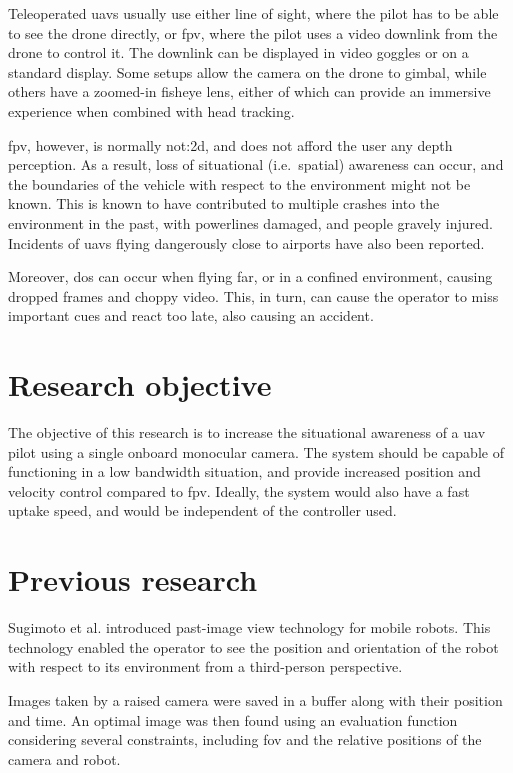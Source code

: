 Teleoperated \glspl{uav} usually use either line of sight, where the pilot has to be able to see the drone directly, or \gls{fpv}, where the pilot uses a video downlink from the drone to control it.
The downlink can be displayed in video goggles or on a standard display.
Some setups allow the camera on the drone to gimbal, while others have a zoomed-in fisheye lens, either of which can provide an immersive experience when combined with head tracking.

\gls{fpv}, however, is normally \gls{not:2d}, and does not afford the user any depth perception.
As a result, loss of situational (i.e.\ spatial) awareness can occur, and the boundaries of the vehicle with respect to the environment might not be known.
This is known to have contributed to multiple crashes into the environment in the past, with powerlines damaged,\cite{latimes2015} and people gravely injured.\cite{seattletimes2015,bbcnews2015}
Incidents of \glspl{uav} flying dangerously close to airports have also been reported.\cite{ctvnews2014}

Moreover, \gls{dos} can occur when flying far, or in a confined environment, causing dropped frames and choppy video.
This, in turn, can cause the operator to miss important cues and react too late, also causing an accident.

\section{Research objective}
The objective of this research is to increase the situational awareness of a \gls{uav} pilot using a single onboard monocular camera.
The system should be capable of functioning in a low bandwidth situation, and provide increased position and velocity control compared to \gls{fpv}.
Ideally, the system would also have a fast uptake speed, and would be independent of the controller used.

\section{Previous research}
Sugimoto et al. introduced past-image view technology for mobile robots.\cite{sugimoto2005}
This technology enabled the operator to see the position and orientation of the robot with respect to its environment from a third-person perspective.

Images taken by a raised camera were saved in a buffer along with their position and time.
An optimal image was then found using an evaluation function considering several constraints, including \gls{fov} and the relative positions of the camera and robot.

